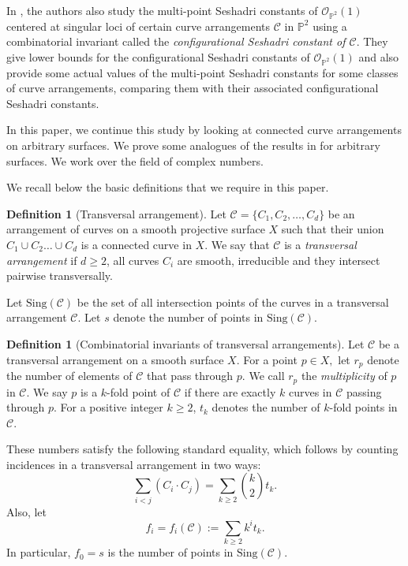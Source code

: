 \documentclass[12pt,reqno]{amsart}
\theoremstyle{plain}
\numberwithin{equation}{section}
\theoremstyle{definition}
\newtheorem{definition}[theorem]{Definition}
\begin{document}
    	In \cite{JP}, the authors also study the multi-point Seshadri constants of $\mathcal{O}_{\mathbb{P}^{2}}(1)$ centered at singular loci of certain curve arrangements $\mathcal{C}$ in $\mathbb{P}^{2}$ using a combinatorial invariant called the  \textit{configurational Seshadri constant of $\mathcal{C}$}. They give lower bounds for the configurational Seshadri constants of $\mathcal{O}_{\mathbb{P}^{2}}(1)$ and also provide some actual values of the multi-point Seshadri constants for some classes of curve arrangements, comparing them with their associated configurational Seshadri constants.
	
In this paper, we continue this study by looking at connected curve arrangements on arbitrary surfaces. We prove some analogues of the results in \cite{JP} for arbitrary surfaces. We work over the field of complex numbers. 


We recall below the basic definitions that we require in this paper. 	
	

	\begin{definition}[Transversal arrangement]
		Let $\mathcal{C}=\{C_1,C_2, \ldots ,C_d\}$ be an arrangement of curves
		on a smooth projective surface $X$ such that their union $C_1 \cup C_2 \dots \cup C_d$ is a connected curve in $X$. 
		We say that $\mathcal{C}$ is a \emph{transversal arrangement}
		if $d\geq 2$, all  curves $C_i$ are smooth, irreducible 
		and they intersect pairwise transversally.
	\end{definition}
	
	Let $\text{Sing}(\mathcal{C})$ be the set of all intersection points
	of the curves in a transversal arrangement $\mathcal{C}$. 
	Let $s$ denote the number of points in $\text{Sing}(\mathcal{C})$. 
	
	
	\begin{definition}[Combinatorial invariants of transversal arrangements]
		Let	$\mathcal{C}$ be a transversal arrangement on a smooth surface
		$X$. For a point $p\in X,$
		let $r_p$ denote the  number of elements of $\mathcal{C}$ that pass
		through $p$. We call $r_p$ the \textit{multiplicity} of $p$ in
		$\mathcal{C}.$ We say $p$ is a $k$-fold point of $\mathcal{C}$ 
		if there are exactly $k$ curves in $\mathcal{C}$ passing through $p.$
		For a positive integer $k\geq2$, $t_k$ denotes the number of $k$-fold points in $\mathcal{C}$.
	\end{definition}
	These numbers satisfy the following standard equality, which follows by
	counting incidences in a transversal arrangement in two ways:
	\begin{equation}\label{eq:combinatorial general}
		\sum_{i<j}(C_i\cdot C_j)=\sum_{k\geq 2}\binom{k}{2}t_k.
	\end{equation}
	Also, let $$f_i=f_i(\mathcal C) :=\sum_{k\geq 2}k^i t_k.$$
	In particular, $f_0=s$ is the number of points in
	$\text{Sing}(\mathcal{C})$. 
	
\end{document}
